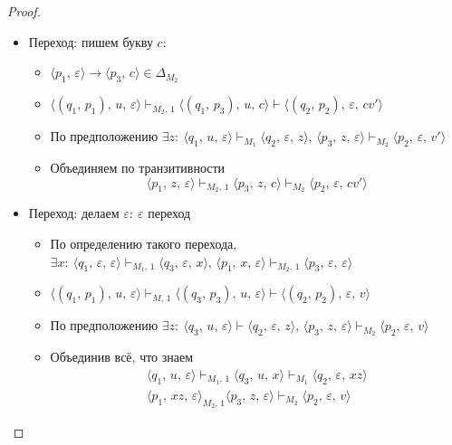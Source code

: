 \documentclass[a4paper,12pt]{article}
\theoremstyle{plain}
\theoremstyle{definition}
\theoremstyle{remark}
\begin{document}
\begin{proof}
\begin{itemize}
		\item Переход: пишем букву $c$:
		      \begin{itemize}
			      \item $\langle p_1,\,\varepsilon\rangle \to \langle p_3,\,c\rangle \in \Delta_{M_2}$
			      \item $\langle(q_1,\,p_1),\,u,\,\varepsilon\rangle\vdash_{M_2,\,1}\langle(q_1,\,p_3),\,u,\,c\rangle\vdash\langle(q_2,\,p_2),\,\varepsilon,\,cv'\rangle$
			      \item По предположению $\exists z :\: \langle q_1,\,u,\,\varepsilon\rangle\vdash_{M_1}\langle q_2,\,\varepsilon,\,z\rangle,\,\langle p_3,\,z,\,\varepsilon\rangle\vdash_{M_2}\langle p_2,\,\varepsilon,\,v'\rangle$
			      \item Объединяем по транзитивности
			            \[
				            \langle p_1,\,z,\,\varepsilon\rangle\vdash_{M_2,\,1}\langle p_3,\,z,\,c\rangle\vdash_{M_2}\langle p_2,\,\varepsilon,\,cv'\rangle
			            \]
		      \end{itemize}
		\item Переход: делаем $\varepsilon:\:\varepsilon$ переход
		      \begin{itemize}
			      \item По определению такого перехода, $\exists x :\: \langle q_1,\,\varepsilon,\,\varepsilon\rangle\vdash_{M_1,\,1}\langle q_3,\,\varepsilon,\,x\rangle,\, \langle p_1,\,x,\,\varepsilon\rangle\vdash_{M_2,\,1}\langle p_3,\,\varepsilon,\,\varepsilon\rangle$
			      \item $\langle(q_1,\,p_1),\,u,\,\varepsilon\rangle\vdash_{M,\,1}\langle(q_3,\,p_3),\,u,\,\varepsilon\rangle\vdash\langle(q_2,\,p_2),\,\varepsilon,\,v\rangle$
			      \item По предположению $\exists z :\: \langle q_3,\,u,\,\varepsilon\rangle\vdash\langle q_2,\,\varepsilon,\,z\rangle,\, \langle p_3,\,z,\,\varepsilon\rangle\vdash_{M_2}\langle p_2,\,\varepsilon,\,v\rangle$
			      \item Объединив всё, что знаем
						\begin{align*}
							\langle q_1,\,u,\,\varepsilon\rangle\vdash_{M_1,\,1}\langle q_3,\,u,\,x\rangle\vdash_{M_1}\langle q_2,\,\varepsilon,\,xz\rangle\\
							\langle p_1,\,xz,\,\varepsilon\rangle_{M_2,\,1}\langle p_3,\,z,\,\varepsilon\rangle\vdash_{M_2}\langle p_2,\,\varepsilon,\,v\rangle
						\end{align*}
					\end{itemize}
	\end{itemize}

\end{proof}
\end{document}
